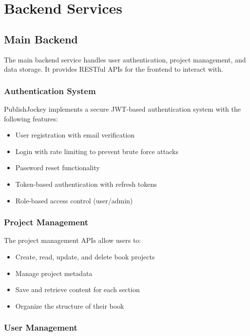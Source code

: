 \documentclass[12pt,a4paper]{book}
\begin{document}
\chapter{Backend Services}

\section{Main Backend}

The main backend service handles user authentication, project management, and data storage. It provides RESTful APIs for the frontend to interact with.

\subsection{Authentication System}

PublishJockey implements a secure JWT-based authentication system with the following features:

\begin{itemize}
  \item User registration with email verification
  \item Login with rate limiting to prevent brute force attacks
  \item Password reset functionality
  \item Token-based authentication with refresh tokens
  \item Role-based access control (user/admin)
\end{itemize}

\subsection{Project Management}

The project management APIs allow users to:

\begin{itemize}
  \item Create, read, update, and delete book projects
  \item Manage project metadata
  \item Save and retrieve content for each section
  \item Organize the structure of their book
\end{itemize}

\subsection{User Management}
\end{document}
